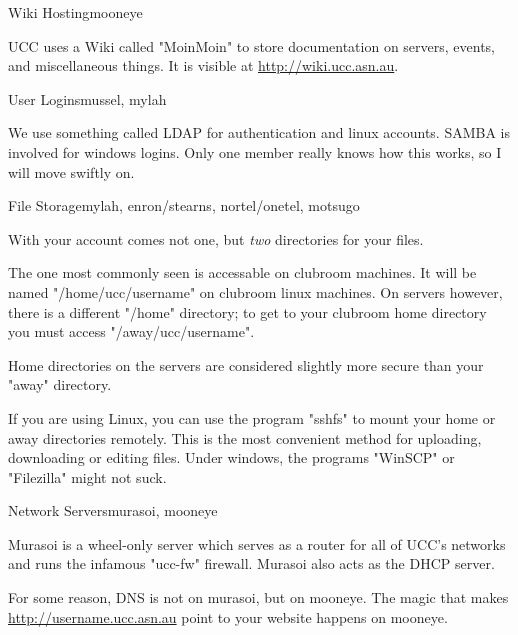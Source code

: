 \begin{uccservice}{Wiki Hosting}{mooneye}

UCC uses a Wiki called "MoinMoin" to store documentation on servers, events, and miscellaneous things. It is visible at \url{http://wiki.ucc.asn.au}.

\end{uccservice}

\begin{uccservice}{User Logins}{mussel, mylah}

We use something called LDAP for authentication and linux accounts. SAMBA is involved for windows logins. Only one member really knows how this works, so I will move swiftly on.

\end{uccservice}

\begin{uccservice}{File Storage}{mylah, enron/stearns, nortel/onetel, motsugo}

With your account comes not one, but \emph{two} directories for your files.

The one most commonly seen is accessable on clubroom machines. It will be named "/home/ucc/username" on clubroom linux machines. On servers however, there is a different "/home" directory; to get to your clubroom home directory you must access "/away/ucc/username".

Home directories on the servers are considered slightly more secure than your "away" directory.

If you are using Linux, you can use the program "sshfs" to mount your home or away directories remotely. This is the most convenient method for uploading, downloading or editing files. Under windows, the programs "WinSCP" or "Filezilla" might not suck.


\end{uccservice}

\begin{uccservice}{Network Servers}{murasoi, mooneye}

Murasoi is a wheel-only server which serves as a router for all of UCC's networks and runs the infamous "ucc-fw" firewall. Murasoi also acts as the DHCP server.

For some reason, DNS is not on murasoi, but on mooneye. The magic that makes \url{http://username.ucc.asn.au} point to your website happens on mooneye.

\end{uccservice}

